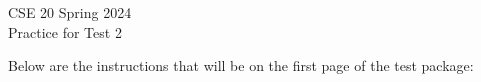 

\newif \ifsolution
\solutiontrue
\solutionfalse

\newcommand{\soltwo}[1]{\medskip\fbox{\begin{minipage}{6.5in}{#1}\end{minipage}}\medskip}


\begin{center}
{\Large
CSE 20 Spring 2024\\ 
Practice for Test 2 \ifsolution{\qquad Solutions}\fi}
\end{center}

\thispagestyle{empty}

\ifsolution{}
\else{}
Below are the instructions that will be on the first page of the test package:

